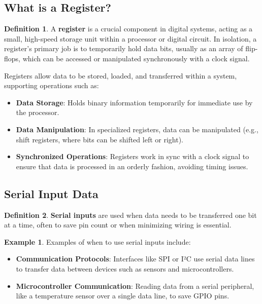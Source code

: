 \documentclass[12pt]{article}
\theoremstyle{definition}
\newtheorem{definition}{Definition}
\newtheorem{example}{Example}
\begin{document}
\subsection{What is a Register?}

\begin{definition}
	A \textbf{register} is a crucial component in digital systems, acting as a small, high-speed storage unit within a processor or digital circuit. In isolation, a register’s primary job is to temporarily hold data bits, usually as an array of flip-flops, which can be accessed or manipulated synchronously with a clock signal.
\end{definition}

Registers allow data to be stored, loaded, and transferred within a system, supporting operations such as:
\begin{itemize}
	\item \textbf{Data Storage}: Holds binary information temporarily for immediate use by the processor.
	\item \textbf{Data Manipulation}: In specialized registers, data can be manipulated (e.g., shift registers, where bits can be shifted left or right).
	\item \textbf{Synchronized Operations}: Registers work in sync with a clock signal to ensure that data is processed in an orderly fashion, avoiding timing issues.
\end{itemize}

\subsection{Serial Input Data}

\begin{definition}
	\textbf{Serial inputs} are used when data needs to be transferred one bit at a time, often to save pin count or when minimizing wiring is essential.
\end{definition}

\begin{example}
	Examples of when to use serial inputs include:
	\begin{itemize}
		\item \textbf{Communication Protocols}: Interfaces like SPI or I²C use serial data lines to transfer data between devices such as sensors and microcontrollers.
		\item \textbf{Microcontroller Communication}: Reading data from a serial peripheral, like a temperature sensor over a single data line, to save GPIO pins.
	\end{itemize}
\end{example}
\end{document}
